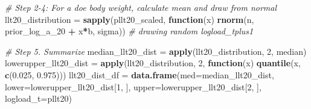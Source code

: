 \documentclass[
]{article}
\newenvironment{Shaded}{\begin{snugshade}}{\end{snugshade}}
\newcommand{\AttributeTok}[1]{\textcolor[rgb]{0.13,0.29,0.53}{#1}}
\newcommand{\CommentTok}[1]{\textcolor[rgb]{0.56,0.35,0.01}{\textit{#1}}}
\newcommand{\ControlFlowTok}[1]{\textcolor[rgb]{0.13,0.29,0.53}{\textbf{#1}}}
\newcommand{\DecValTok}[1]{\textcolor[rgb]{0.00,0.00,0.81}{#1}}
\newcommand{\FloatTok}[1]{\textcolor[rgb]{0.00,0.00,0.81}{#1}}
\newcommand{\FunctionTok}[1]{\textcolor[rgb]{0.13,0.29,0.53}{\textbf{#1}}}
\newcommand{\NormalTok}[1]{#1}
\newcommand{\OtherTok}[1]{\textcolor[rgb]{0.56,0.35,0.01}{#1}}
\newcommand{\SpecialCharTok}[1]{\textcolor[rgb]{0.81,0.36,0.00}{\textbf{#1}}}
\begin{document}
\begin{Shaded}
\begin{Highlighting}[]
\CommentTok{\# Step 2{-}4: For a doe body weight, calculate mean and draw from normal}
\NormalTok{llt20\_distribution }\OtherTok{=} \FunctionTok{sapply}\NormalTok{(pllt20\_scaled, }\ControlFlowTok{function}\NormalTok{(x) }\FunctionTok{rnorm}\NormalTok{(n, prior\_log\_a\_20 }\SpecialCharTok{+}\NormalTok{ x}\SpecialCharTok{*}\NormalTok{b, sigma)) }\CommentTok{\# drawing random logload\_tplus1}

\CommentTok{\# Step 5. Summarize}
\NormalTok{median\_llt20\_dist }\OtherTok{=} \FunctionTok{apply}\NormalTok{(llt20\_distribution, }\DecValTok{2}\NormalTok{, median)}
\NormalTok{lowerupper\_llt20\_dist }\OtherTok{=} \FunctionTok{apply}\NormalTok{(llt20\_distribution, }\DecValTok{2}\NormalTok{, }\ControlFlowTok{function}\NormalTok{(x) }\FunctionTok{quantile}\NormalTok{(x, }\FunctionTok{c}\NormalTok{(}\FloatTok{0.025}\NormalTok{, }\FloatTok{0.975}\NormalTok{)))}
\NormalTok{llt20\_dist\_df }\OtherTok{=} \FunctionTok{data.frame}\NormalTok{(}\AttributeTok{med=}\NormalTok{median\_llt20\_dist, }
                     \AttributeTok{lower=}\NormalTok{lowerupper\_llt20\_dist[}\DecValTok{1}\NormalTok{, ], }
                     \AttributeTok{upper=}\NormalTok{lowerupper\_llt20\_dist[}\DecValTok{2}\NormalTok{, ],}
                     \AttributeTok{logload\_t=}\NormalTok{pllt20)}


\end{Highlighting}
\end{Shaded}
\end{document}
